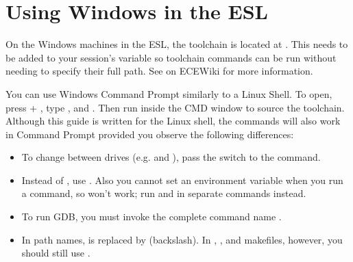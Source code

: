 \section{Using Windows in the ESL} \label{esl-windows}

On the Windows machines in the ESL, the toolchain is located at
. This needs to be added to your session's
 variable so toolchain commands can be run without needing to
specify their full path. See
 on ECEWiki for more
information.

You can use Windows Command Prompt similarly to a Linux Shell. To open, press
 + , type , and . Then run
 inside the CMD
window to source the toolchain. Although this guide is written for the Linux
shell, the commands will also work in Command Prompt provided you observe the
following differences:
\begin{itemize}
\item To change between drives (e.g.  and ), pass the
 switch to the  command.
\item Instead of , use .
Also you cannot set an environment variable when you run a command, so
 won't work; run  and  in
separate commands instead.
\item To run GDB, you must invoke the complete command name
.
\item In path names, \file{/} is replaced by \file{\textbackslash}
(backslash). In , , and makefiles, however, you
should still use \file{/}.
\end{itemize}
